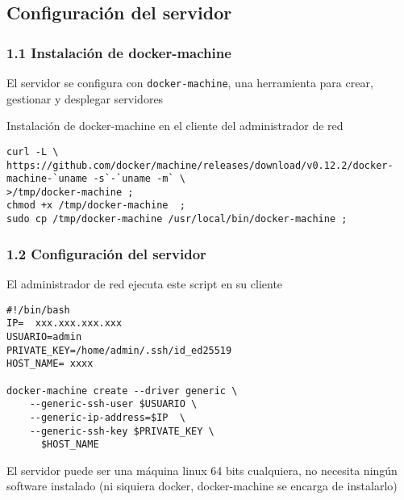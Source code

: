 \documentclass[ucs]{beamer}
\begin{document}
\subsection{Configuración del servidor}
\begin{frame}[fragile]
\frametitle{1.1 Instalación de docker-machine}

El servidor se configura con
\verb|docker-machine|, una herramienta para crear, gestionar y desplegar
servidores

Instalación de docker-machine en el cliente del administrador de red

  \begin{tiny}
  \begin{verbatim}
curl -L \
https://github.com/docker/machine/releases/download/v0.12.2/docker-machine-`uname -s`-`uname -m` \
>/tmp/docker-machine ;
chmod +x /tmp/docker-machine  ;
sudo cp /tmp/docker-machine /usr/local/bin/docker-machine ;
  \end{verbatim}
  \end{tiny}


\end{frame}



\begin{frame}[fragile]
\frametitle{1.2 Configuración del servidor}

El administrador de red ejecuta este script en su cliente
  \begin{scriptsize}
  \begin{verbatim}
#!/bin/bash
IP=  xxx.xxx.xxx.xxx 
USUARIO=admin
PRIVATE_KEY=/home/admin/.ssh/id_ed25519
HOST_NAME= xxxx

docker-machine create --driver generic \
    --generic-ssh-user $USUARIO \
    --generic-ip-address=$IP  \
    --generic-ssh-key $PRIVATE_KEY \
      $HOST_NAME
  \end{verbatim}
  \end{scriptsize}

El servidor puede ser una máquina linux 64 bits cualquiera, no necesita ningún software instalado
(ni siquiera docker, docker-machine se encarga de instalarlo)

\end{frame}
\end{document}
